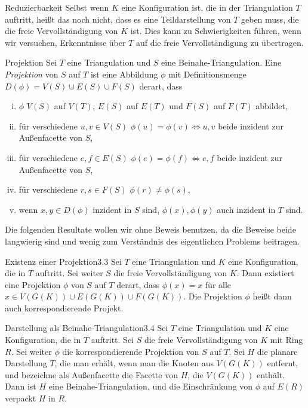 \begin{section}{Reduzierbarkeit}
 Selbst wenn $K$ eine Konfiguration ist, die in der Triangulation $T$ auftritt, heißt das noch nicht, dass es eine Teildarstellung von $T$ geben muss, die die freie Vervollständigung von $K$ ist. Dies kann zu Schwierigkeiten führen, wenn wir versuchen, Erkenntnisse über $T$ auf die freie Vervollständigung zu übertragen. 
 
 \begin{definition}{Projektion}
  Sei $T$ eine Triangulation und $S$ eine Beinahe-Triangulation. Eine \textit{Projektion} von $S$ auf $T$ ist eine Abbildung $\phi$ mit Definitionsmenge $D(\phi) = V(S)\cup E(S)\cup F(S)$ derart, dass
  \begin{enumerate}[(i)]
   \item $\phi$ $V(S)$ auf $V(T)$, $E(S)$ auf $E(T)$ und $F(S)$ auf $F(T)$ abbildet,
   \item für verschiedene $u,v \in V(S)$ $\phi(u) = \phi(v) \Leftrightarrow u,v$ beide inzident zur Außenfacette von $S$,
   \item für verschiedene $e,f \in E(S)$ $\phi(e) = \phi(f) \Leftrightarrow e,f$ beide inzident zur Außenfacette von $S$,
   \item für verschiedene $r,s \in F(S)$ $\phi(r) \neq \phi(s)$,
   \item wenn $x,y \in D(\phi)$ inzident in $S$ sind, $\phi(x),\phi(y)$ auch inzident in $T$ sind.
  \end{enumerate}
 \end{definition}
 
 Die folgenden Resultate wollen wir ohne Beweis benutzen, da die Beweise beide langwierig sind und wenig zum Verständnis des eigentlichen Problems beitragen.

 \begin{satzl}{Existenz einer Projektion}{3.3}
  Sei $T$ eine Triangulation und $K$ eine Konfiguration, die in $T$ auftritt. Sei weiter $S$ die freie Vervollständigung von $K$. Dann existiert eine Projektion $\phi$ von $S$ auf $T$ derart, dass $\phi(x) = x$ für alle $x\in V(G(K)) \cup E(G(K)) \cup F(G(K))$. Die Projektion $\phi$ heißt dann auch korrespondierende Projekt.
 \end{satzl}
 
 \begin{satzl}{Darstellung als Beinahe-Triangulation}{3.4}
  Sei $T$ eine Triangulation und $K$ eine Konfiguration, die in $T$ auftritt. Sei $S$ die freie Vervollständigung von $K$ mit Ring $R$. Sei weiter $\phi$ die korrespondierende Projektion von $S$ auf $T$. Sei $H$ die planare Darstellung $T$, die man erhält, wenn man die Knoten aus $V(G(K))$ entfernt, und bezeichne als Außenfacette die Facette von $H$, die $V(G(K))$ enthält. Dann ist $H$ eine Beinahe-Triangulation, und die Einschränkung von $\phi$ auf $E(R)$ verpackt $H$ in $R$.  
 \end{satzl}


\end{section}
